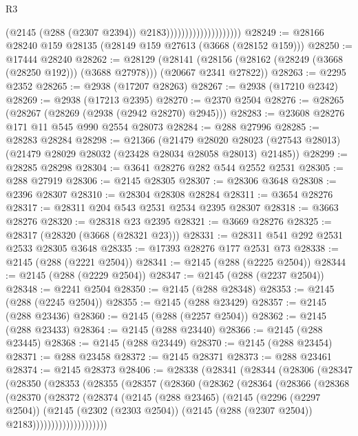 \begin{lexlean}{R3}
\begin{coremodule}
                                          (@2145 (@288 (@2307 @2394)) @2183))))))))))))))))))))
@28249 := @28166 @28240 @159 @28135 (@28149 @159 @27613 (@3668 (@28152 @159)))
@28250 := @17444 @28240
@28262 := @28129
    (@28141 (@28156 (@28162 (@28249 (@3668 (@28250 @192))) (@3688 @27978))) (@20667 @2341 @27822))
@28263 := @2295 @2352
@28265 := @2938 (@17207 @28263)
@28267 := @2938 (@17210 @2342)
@28269 := @2938 (@17213 @2395)
@28270 := @2370 @2504
@28276 := @28265 (@28267 (@28269 (@2938 (@2942 @28270) @2945)))
@28283 := @23608 @28276 @171 @11 @545 @990 @2554 @28073
@28284 := @288 @27996
@28285 := @28283 @28284
@28298 := @21366
    (@21479
      @28020
      @28023
      (@27543 @28013)
      (@21479 @28029 @28032 (@23428 @28034 @28058 @28013) @21485))
@28299 := @28285 @28298
@28304 := @3641 @28276 @282 @544 @2552 @2531
@28305 := @288 @27919
@28306 := @2145 @28305
@28307 := @28306 @3648
@28308 := @2396 @28307
@28310 := @28304 @28308 @28284
@28311 := @3654 @28276
@28317 := @28311 @204 @543 @2531 @2534 @2395 @28307
@28318 := @3663 @28276
@28320 := @28318 @23 @2395
@28321 := @3669 @28276
@28325 := @28317 (@28320 (@3668 (@28321 @23)))
@28331 := @28311 @541 @292 @2531 @2533 @28305 @3648
@28335 := @17393 @28276 @177 @2531 @73
@28338 := @2145 (@288 (@2221 @2504))
@28341 := @2145 (@288 (@2225 @2504))
@28344 := @2145 (@288 (@2229 @2504))
@28347 := @2145 (@288 (@2237 @2504))
@28348 := @2241 @2504
@28350 := @2145 (@288 @28348)
@28353 := @2145 (@288 (@2245 @2504))
@28355 := @2145 (@288 @23429)
@28357 := @2145 (@288 @23436)
@28360 := @2145 (@288 (@2257 @2504))
@28362 := @2145 (@288 @23433)
@28364 := @2145 (@288 @23440)
@28366 := @2145 (@288 @23445)
@28368 := @2145 (@288 @23449)
@28370 := @2145 (@288 @23454)
@28371 := @288 @23458
@28372 := @2145 @28371
@28373 := @288 @23461
@28374 := @2145 @28373
@28406 := @28338
    (@28341
      (@28344
        (@28306
          (@28347
            (@28350
              (@28353
                (@28355
                  (@28357
                    (@28360
                      (@28362
                        (@28364
                          (@28366
                            (@28368
                              (@28370
                                (@28372
                                  (@28374
                                    (@2145
                                      (@288 @23465)
                                      (@2145
                                        (@2296 (@2297 @2504))
                                        (@2145
                                          (@2302 (@2303 @2504))
                                          (@2145 (@288 (@2307 @2504)) @2183))))))))))))))))))))

\end{coremodule}
\end{lexlean}
